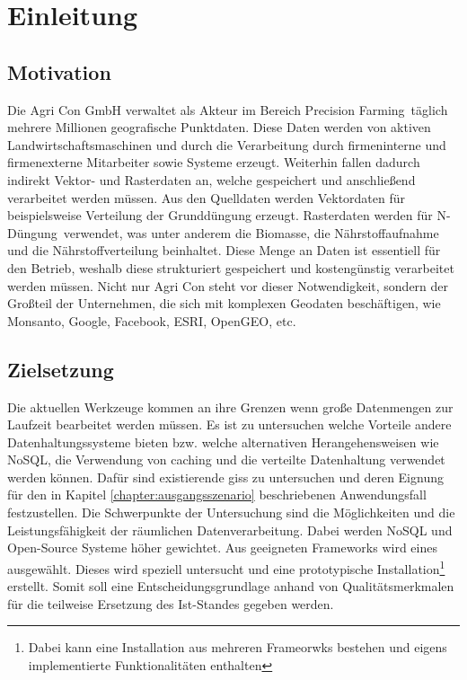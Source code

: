 \chapter{Einleitung}


\section{Motivation}

Die Agri Con GmbH verwaltet als Akteur im Bereich \glqq Precision Farming\grqq\ täglich mehrere Millionen geografische Punktdaten. Diese Daten werden von aktiven Landwirtschaftsmaschinen und durch die Verarbeitung durch firmeninterne und firmenexterne Mitarbeiter sowie Systeme erzeugt. Weiterhin fallen dadurch indirekt Vektor- und Rasterdaten an, welche gespeichert und anschließend verarbeitet werden müssen.
Aus den Quelldaten werden Vektordaten für beispielsweise Verteilung der Grunddüngung erzeugt. Rasterdaten werden für \glqq N-Düngung\grqq\  verwendet, was unter anderem die Biomasse, die Nährstoffaufnahme und die Nährstoffverteilung beinhaltet.
Diese Menge an Daten ist essentiell für den Betrieb, weshalb diese strukturiert gespeichert und kostengünstig verarbeitet werden müssen. Nicht nur Agri Con steht vor dieser Notwendigkeit, sondern der Großteil der Unternehmen, die sich mit komplexen Geodaten beschäftigen, wie Monsanto, Google, Facebook, ESRI, OpenGEO, etc.




\section{Zielsetzung}

Die aktuellen Werkzeuge kommen an ihre Grenzen wenn große Datenmengen zur Laufzeit bearbeitet werden müssen. Es ist zu untersuchen welche Vorteile andere Datenhaltungssysteme bieten bzw. welche alternativen Herangehensweisen wie NoSQL, die Verwendung von caching und die verteilte Datenhaltung verwendet werden können.
Dafür sind existierende \Glspl{gis} zu untersuchen und deren Eignung für den in Kapitel \ref{chapter:ausgangsszenario} beschriebenen Anwendungsfall festzustellen. Die Schwerpunkte der Untersuchung sind die Möglichkeiten und die Leistungsfähigkeit der räumlichen Datenverarbeitung.
Dabei werden NoSQL und Open-Source Systeme höher gewichtet.
Aus geeigneten Frameworks wird eines ausgewählt. Dieses wird speziell untersucht und eine prototypische Installation\footnote{Dabei kann eine Installation aus mehreren Frameorwks bestehen und eigens implementierte Funktionalitäten enthalten} erstellt.
Somit soll eine Entscheidungsgrundlage anhand von Qualitätsmerkmalen für die teilweise Ersetzung des Ist-Standes gegeben werden.

